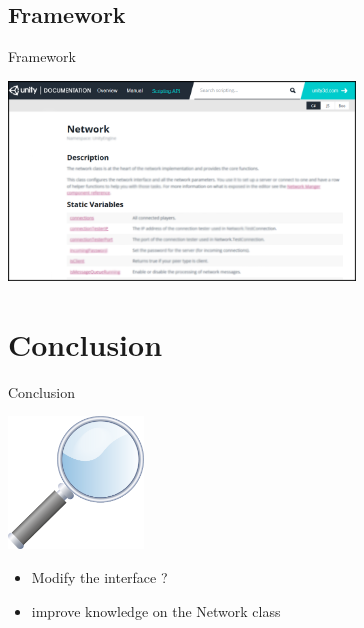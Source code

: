 \documentclass[a4paper,10pt]{beamer}
\begin{document}
		\subsection{Framework}
		
			\begin{frame}{Framework}
				\centerline{\includegraphics[height=150pt]{images/network/networkclass.png}}
			\end{frame}
	
	\section{Conclusion}
	
		\begin{frame}{Conclusion}
			\centerline{\includegraphics[height=100pt]{images/conclusion/loupe.png}}
			\begin{itemize}
				\item Modify the interface ?
				\item improve knowledge on the Network class
			\end{itemize}
		\end{frame}
\end{document}

